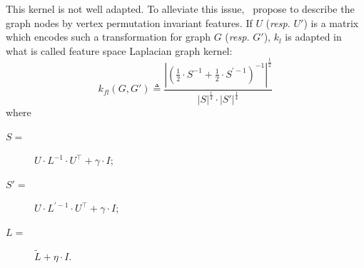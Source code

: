                     This kernel is not well adapted.
                    To alleviate this issue,~\textcite{kondor2016multiscale} propose to describe the graph nodes by vertex permutation invariant features.
                    If $U$ (\textit{resp.} $U'$) is a matrix which encodes such a transformation for graph $G$ (\textit{resp.} $G'$), $k_{l}$ is adapted in what is called feature space Laplacian graph kernel:
                    \begin{equation}
                        \label{eq::feature_laplacian_kernel}
                        k_{fl}(G, G') \triangleq \frac{\left\lvert \left(\frac{1}{2} \cdot S^{-1} + \frac{1}{2} \cdot S^{\prime -1} \right)^{-1} \right\rvert^{\frac{1}{2}}}{\left\lvert S\right\rvert^{\frac{1}{4}}\cdot\left\lvert S' \right\rvert^{\frac{1}{4}}}
                    \end{equation}
                    where 
                    \begin{description}
                        \item[\(S =\)] \(U\cdot L^{-1}\cdot U^\intercal + \gamma \cdot I\);
                        \item[\(S' =\)] \(U\cdot L^{\prime -1}\cdot U^\intercal + \gamma \cdot I\);
                        \item[\(L = \)] \(\widetilde{L} + \eta \cdot I\).
                    \end{description}

